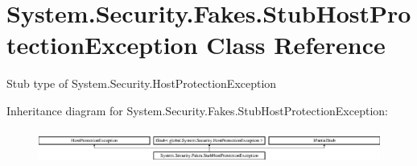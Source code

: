 \hypertarget{class_system_1_1_security_1_1_fakes_1_1_stub_host_protection_exception}{\section{System.\-Security.\-Fakes.\-Stub\-Host\-Protection\-Exception Class Reference}
\label{class_system_1_1_security_1_1_fakes_1_1_stub_host_protection_exception}
}


Stub type of System.\-Security.\-Host\-Protection\-Exception 


Inheritance diagram for System.\-Security.\-Fakes.\-Stub\-Host\-Protection\-Exception\-:\begin{figure}[H]
\begin{center}
\leavevmode
\includegraphics[height=1.091618cm]{class_system_1_1_security_1_1_fakes_1_1_stub_host_protection_exception}
\end{center}
\end{figure}
